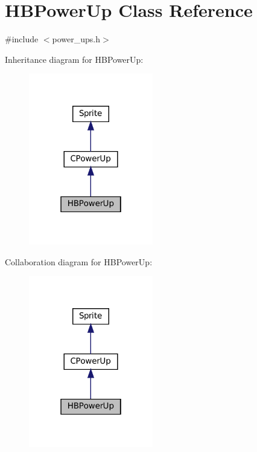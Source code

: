 \hypertarget{classHBPowerUp}{}\section{H\+B\+Power\+Up Class Reference}
\label{classHBPowerUp}


{\ttfamily \#include $<$power\+\_\+ups.\+h$>$}



Inheritance diagram for H\+B\+Power\+Up\+:
\nopagebreak
\begin{figure}[H]
\begin{center}
\leavevmode
\includegraphics[width=154pt]{classHBPowerUp__inherit__graph}
\end{center}
\end{figure}


Collaboration diagram for H\+B\+Power\+Up\+:
\nopagebreak
\begin{figure}[H]
\begin{center}
\leavevmode
\includegraphics[width=154pt]{classHBPowerUp__coll__graph}
\end{center}
\end{figure}

